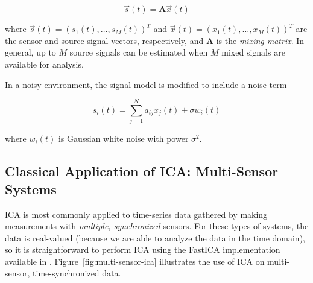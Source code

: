 \documentclass[10pt]{article}
\begin{document}
$$
\vec{s}(t) = \mathbf{A} \vec{x}(t)
$$

\noindent where $\vec{s}(t) =  (s_1(t), \ldots, s_M(t))^T$ and
$\vec{x}(t) =  (x_1(t), \ldots, x_M(t))^T$
are the sensor and source signal vectors, respectively, and $\mathbf{A}$ is the
\emph{mixing matrix}. In general, up to $M$ source signals can be estimated when $M$ mixed
signals are available for analysis.

In a noisy environment, the signal model is modified to include a noise term

$$
s_i(t) = \sum_{j=1}^N a_{ij} x_j(t) + \sigma w_i(t)
$$

\noindent where $w_i(t)$ is Gaussian white noise with power $\sigma^2$.

\subsection*{Classical Application of ICA: Multi-Sensor Systems}
ICA is most commonly applied to time-series data gathered by making measurements with
\emph{multiple, synchronized} sensors. For these types of systems, the data is real-valued
(because we are able to analyze the data in the time domain), so it is straightforward to
perform ICA using the FastICA implementation available in .
Figure~\ref{fig:multi-sensor-ica} illustrates the use of ICA on multi-sensor,
time-synchronized data.
\end{document}
